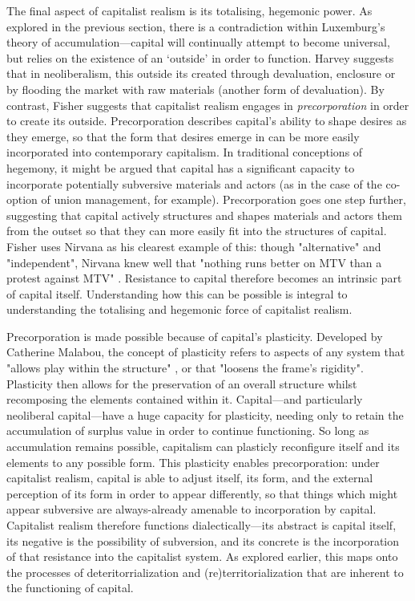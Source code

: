 The final aspect of capitalist realism is its totalising, hegemonic power. As explored in the previous section,  there is a contradiction within Luxemburg's theory of accumulation—capital will continually attempt to become universal, but relies on the existence of an `outside' in order to function. Harvey suggests that in neoliberalism, this outside its created through devaluation, enclosure or by flooding the market with raw materials (another form of devaluation). By contrast, Fisher suggests that capitalist realism engages in \emph{precorporation} in order to create its outside. Precorporation describes capital's ability to shape desires as they emerge, so that the form that desires emerge in can be more easily incorporated into contemporary capitalism. In traditional conceptions of hegemony, it might be argued that capital has a significant capacity to incorporate potentially subversive materials and actors (as in the case of the co-option of union management, for example). Precorporation goes one step further, suggesting that capital actively structures and shapes materials and actors them from the outset so that they can more easily fit into the structures of capital. Fisher uses Nirvana as his clearest example of this: though "alternative" and "independent", Nirvana knew well that "nothing runs better on MTV than a protest against MTV" \citep[p. 13]{fisher_capitalist_2009}. Resistance to capital therefore becomes an intrinsic part of capital itself. Understanding how this can be possible is integral to understanding the totalising and hegemonic force of capitalist realism.

Precorporation is made possible because of capital's plasticity. Developed by Catherine Malabou, the concept of plasticity refers to aspects of any system that "allows play within the structure" \citep[p. 44]{malabou_will_2015}, or that "loosens the frame's rigidity". Plasticity then allows for the preservation of an overall structure whilst recomposing the elements contained within it. Capital—and particularly neoliberal capital—have a huge capacity for plasticity, needing only to retain the accumulation of surplus value in order to continue functioning. So long as accumulation remains possible, capitalism can plasticly reconfigure itself and its elements to any possible form. This plasticity enables precorporation:  under capitalist realism, capital is able to adjust itself, its form, and the external perception of its form in order to appear differently, so that things which might appear subversive are always-already amenable to incorporation by capital. Capitalist realism therefore functions dialectically—its abstract is capital itself, its negative is the possibility of subversion, and its concrete is the incorporation of that resistance into the capitalist system. As explored earlier, this maps onto the processes of deteritorrialization and (re)territorialization that are inherent to the functioning of capital.

